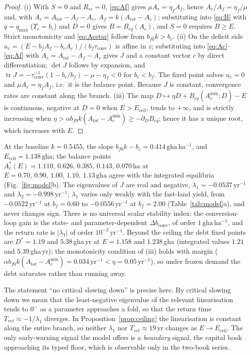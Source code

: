 \documentclass[preprint,12pt,authoryear]{elsarticle}
\newcommand{\dconv}{\Delta b_{\mathrm{conv}}}
\newcommand{\Ups}{\Upsilon_c}
\newcommand{\Eceil}{E_{\mathrm{ceil}}}
\newcommand{\Acmin}{A_c^{\min}}
\newcommand{\tconv}{\tau_{\mathrm{conv}}}
\begin{document}
\begin{proof}
(i) With $S=0$ and $R_{rc}=0$, \eqref{eq:Af} gives $\mu A_r=\eta_fA_f$, hence $A_r/A_f=\eta_f/\mu$ and, with $A_r=A_{tot}-A_f-A_c$, $A_f=k(A_{tot}-A_c)$; substituting into \eqref{eq:B} with $q=q_{\max}$ ($\Ups=b_c$) and $D=0$ gives $B=B_{eq}(A_c)$, and $S=0$ requires $B\ge E$. Strict monotonicity and \eqref{eq:Acstar} follow from $b_{f0}k>b_c$. (ii) On the deficit side $u_c=(E-b_fA_f-b_cA_c)/(b_f\tconv)$ is affine in $z$; substituting into \eqref{eq:Ac}--\eqref{eq:Af} with $A_r=A_{tot}-A_f-A_c$ gives $J$ and a constant vector $c$ by direct differentiation; $\det J$ follows by expansion, and $\operatorname{tr}J=-\tconv^{-1}(1-b_c/b_f)-\mu-\eta_f<0$ for $b_c<b_f$. The fixed point solves $u_c=0$ and $\mu A_r=\eta_fA_f$, i.e.\ it is the balance point. Because $J$ is constant, convergence rates are constant along the branch. (iii) The map $D\mapsto\eta D+B_{eq}(\Acmin;D)-E$ is continuous, negative at $D=0$ when $E>\Eceil$, tends to $+\infty$, and is strictly increasing when $\eta>\alpha b_{f0}k(A_{tot}-\Acmin)\ge-\partial_DB_{eq}$; hence it has a unique root, which increases with $E$.
\end{proof}

At the baseline $k=0.5455$, the slope $b_{f0}k-b_c=0.414\,\mathrm{gha\,ha^{-1}}$, and $\Eceil=1.138\,\mathrm{gha}$; the balance points $A_c^*(E)=1.110,\,0.626,\,0.385,\,0.143,\,0.070\,\mathrm{ha}$ at $E=0.70,\,0.90,\,1.00,\,1.10,\,1.13\,\mathrm{gha}$ agree with the integrated equilibria (Fig.~\ref{fig:model}b). The eigenvalues of $J$ are real and negative, $\lambda_1=-0.0537\,\mathrm{yr}^{-1}$ and $\lambda_2=-0.998\,\mathrm{yr}^{-1}$; $\lambda_1$ varies only weakly with the fast-land yield, from $-0.0522\,\mathrm{yr}^{-1}$ at $b_f=0.60$ to $-0.0556\,\mathrm{yr}^{-1}$ at $b_f=2.00$ (Table~\ref{tab:model}a), and never changes sign. There is no universal scalar stability index: the conversion-loop gain is the state- and parameter-dependent $\dconv$, of order $1\,\mathrm{gha\,ha^{-1}}$, and the return rate is $|\lambda_1|$ of order $10^{-2}\,\mathrm{yr}^{-1}$. Beyond the ceiling the debt fixed points are $D^*=1.19$ and $5.38$\,gha\,yr at $E=1.158$ and $1.238$\,gha (integrated values $1.21$ and $5.39$\,gha\,yr); the monotonicity condition of (iii) holds with margin ($\alpha b_{f0}k(A_{tot}-\Acmin)=0.034\,\mathrm{yr}^{-1}<\eta=0.05\,\mathrm{yr}^{-1}$), so under frozen demand the debt saturates rather than running away.

The statement ``no critical slowing down'' is precise here. By critical slowing down we mean that the least-negative eigenvalue of the relevant linearisation tends to $0^-$ as a parameter approaches a fold, so that the return time $T_{ret}\approx-1/\lambda_1$ diverges. In Proposition~\ref{prop:ceiling} the linearisation is constant along the entire branch, so neither $\lambda_1$ nor $T_{ret}\approx19$\,yr changes as $E\to\Eceil$. The only early-warning signal the model offers is a \emph{boundary} signal, the capital book approaching its typed floor, which is observable only in the two-book series.
\end{document}
